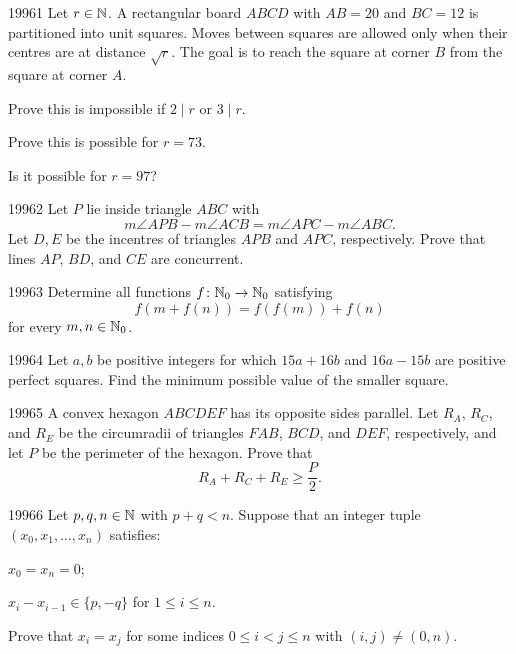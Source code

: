 
\begin{problem}{1996}{1}
Let $r\in\mathbb{N}$. A rectangular board $ABCD$ with $AB=20$ and $BC=12$ is partitioned into unit squares. Moves between squares are allowed only when their centres are at distance $\sqrt r$. The goal is to reach the square at corner $B$ from the square at corner $A$.
\begin{problemsubparts}
    \item Prove this is impossible if $2\mid r$ or $3\mid r$.
    \item Prove this is possible for $r=73$.
    \item Is it possible for $r=97$?
\end{problemsubparts}
\end{problem}

\begin{problem}{1996}{2}
Let $P$ lie inside triangle $ABC$ with
\[
    m\angle APB-m\angle ACB=m\angle APC-m\angle ABC.
\]
Let $D, E$ be the incentres of triangles $APB$ and $APC$, respectively. Prove that lines $AP$, $BD$, and $CE$ are concurrent.
\end{problem}

\begin{problem}{1996}{3}
Determine all functions $f\colon\mathbb{N}_0\to\mathbb{N}_0$ satisfying
\[
    f(m+f(n))=f(f(m))+f(n)
\]
for every $m, n\in\mathbb{N}_0$.
\end{problem}

\begin{problem}{1996}{4}
Let $a, b$ be positive integers for which $15a+16b$ and $16a-15b$ are positive perfect squares. Find the minimum possible value of the smaller square.
\end{problem}

\begin{problem}{1996}{5}
A convex hexagon $ABCDEF$ has its opposite sides parallel. Let $R_A$, $R_C$, and $R_E$ be the circumradii of triangles $FAB$, $BCD$, and $DEF$, respectively, and let $P$ be the perimeter of the hexagon. Prove that
\[
    R_A+R_C+R_E\geq\frac P2.
\]
\end{problem}

\begin{problem}{1996}{6}
Let $p, q, n\in\mathbb{N}$ with $p+q<n$. Suppose that an integer tuple $(x_0, x_1, \dots, x_n)$ satisfies:
\begin{problemclauses}
    \item $x_0=x_n=0$;
    \item $x_i-x_{i-1}\in\{p, -q\}$ for $1\leq i\leq n$.
\end{problemclauses}
Prove that $x_i=x_j$ for some indices $0\leq i<j\leq n$ with $(i, j)\ne(0, n)$.
\end{problem}
